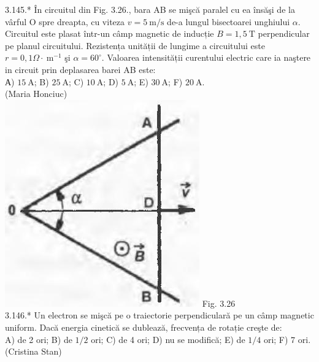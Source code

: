 \documentclass[10pt]{article}
\begin{document}
3.145.* În circuitul din Fig. 3.26., bara AB se mişcă paralel cu ea însăşi de la vârful O spre dreapta, cu viteza $v=5 \mathrm{~m} / \mathrm{s}$ de-a lungul bisectoarei unghiului $\alpha$. Circuitul este plasat într-un câmp magnetic de inducție $B=1,5 \mathrm{~T}$ perpendicular pe planul circuitului. Rezistența unității de lungime a circuitului este $r=0,1 \Omega \cdot \mathrm{~m}^{-1}$ şi $\alpha=60^{\circ}$. Valoarea intensității curentului electric care ia naştere in circuit prin deplasarea barei AB este:\\ А) $15 \mathrm{~A}$; B) $25 \mathrm{~A}$; C) $10 \mathrm{~A}$; D) $5 \mathrm{~A}$; E) $30 \mathrm{~A}$; F) $20 \mathrm{~A}$.\\ (Maria Honciuc)\\ \includegraphics[max width=\textwidth, center]{2025_07_01_5b3ff9fa0d508c8e9f17g-175} Fig. 3.26\\

3.146.* Un electron se mişcă pe o traiectorie perpendiculară pe un câmp magnetic uniform. Dacă energia cinetică se dublează, frecvența de rotație creşte de:\\ A) de 2 ori; B) de $1 / 2$ ori; C) de 4 ori; D) nu se modifică; E) de $1 / 4$ ori; F) 7 ori.\\ (Cristina Stan)\\
\end{document}
